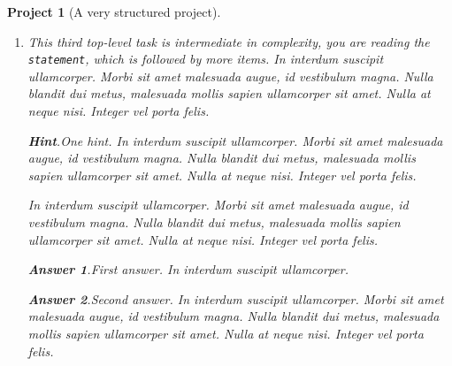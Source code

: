 \documentclass[pdflatex]{sn-jnl}
\theoremstyle{thmstyleone}%
\theoremstyle{thmstyletwo}%
\newtheorem{project}[theorem]{Project}
\theoremstyle{thmstylethree}%
\newcommand{\blocktitlefont}{\relax}
\newcommand{\mono}[1]{\texttt{#1}}
\numberwithin{equation}{section}
\begin{document}
\begin{project}[A very structured project]
\begin{enumerate}[font=\bfseries,label=(\alph*),ref=\alph*]
\begin{enumerate}[font=\bfseries,label=(\roman*),ref=\theenumi.\roman*]
\begin{enumerate}[font=\bfseries,label=(\Alph*),ref=\theenumi.\theenumii.\Alph*]
\par
In interdum suscipit ullamcorper. Morbi sit amet malesuada augue, id vestibulum magna. Nulla blandit dui metus, malesuada mollis sapien ullamcorper sit amet. Nulla at neque nisi. Integer vel porta felis.%
\end{enumerate}%
The conclusion of the structured subtask.  In interdum suscipit ullamcorper. Morbi sit amet malesuada augue, id vestibulum magna. Nulla blandit dui metus, malesuada mollis sapien ullamcorper sit amet. Nulla at neque nisi. Integer vel porta felis.%
\item{}A simple task as the last subtask.  In interdum suscipit ullamcorper. Morbi sit amet malesuada augue, id vestibulum magna. Nulla blandit dui metus, malesuada mollis sapien ullamcorper sit amet. Nulla at neque nisi. Integer vel porta felis.%
\end{enumerate}%
This concludes our structured second task.  In interdum suscipit ullamcorper. Morbi sit amet malesuada augue, id vestibulum magna. Nulla blandit dui metus, malesuada mollis sapien ullamcorper sit amet. Nulla at neque nisi. Integer vel porta felis.%
\item{}This third top-level task is intermediate in complexity, you are reading the \mono{statement}, which is followed by more items. In interdum suscipit ullamcorper. Morbi sit amet malesuada augue, id vestibulum magna. Nulla blandit dui metus, malesuada mollis sapien ullamcorper sit amet. Nulla at neque nisi. Integer vel porta felis.%
\par\smallskip%
\noindent\textbf{\blocktitlefont Hint}.\hypertarget{project-structured-7-2}{}\quad{}One hint.  In interdum suscipit ullamcorper. Morbi sit amet malesuada augue, id vestibulum magna. Nulla blandit dui metus, malesuada mollis sapien ullamcorper sit amet. Nulla at neque nisi. Integer vel porta felis.%
\par
In interdum suscipit ullamcorper. Morbi sit amet malesuada augue, id vestibulum magna. Nulla blandit dui metus, malesuada mollis sapien ullamcorper sit amet. Nulla at neque nisi. Integer vel porta felis.%
\par\smallskip%
\noindent\textbf{\blocktitlefont Answer 1}.\hypertarget{project-structured-7-3}{}\quad{}First answer.  In interdum suscipit ullamcorper.%
\par\smallskip%
\noindent\textbf{\blocktitlefont Answer 2}.\hypertarget{project-structured-7-4}{}\quad{}Second answer.  In interdum suscipit ullamcorper. Morbi sit amet malesuada augue, id vestibulum magna. Nulla blandit dui metus, malesuada mollis sapien ullamcorper sit amet. Nulla at neque nisi. Integer vel porta felis.%

\end{enumerate}
\end{project}
\end{document}

